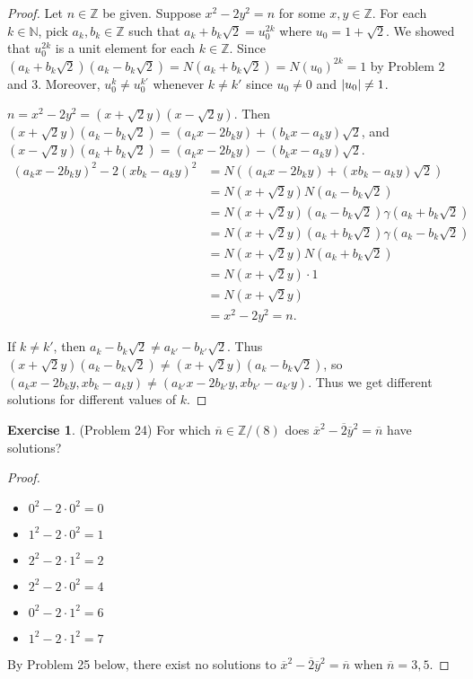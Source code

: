 \documentclass[12pt, psamsfonts]{amsart}
\theoremstyle{definition}
\newtheorem*{exer}{Exercise}
\theoremstyle{remark}
\numberwithin{equation}{section}
\begin{document}
\begin{proof}
  Let $n \in \mathbb{Z}$ be given.
  Suppose $x^2 - 2y^2 = n$ for some $x, y \in \mathbb{Z}$.
  For each $k \in \mathbb{N}$, pick $a_k, b_k \in \mathbb{Z}$ such that $a_k + b_k\sqrt{2} = u_0^{2k}$ where $u_0 = 1 + \sqrt{2}$.
  We showed that $u_0^{2k}$ is a unit element for each $k \in \mathbb{Z}$.
  Since $(a_k + b_k\sqrt{2})(a_k - b_k\sqrt{2}) = N(a_k + b_k\sqrt{2}) = N(u_0)^{2k} = 1$ by Problem 2 and 3.
  Moreover, $u_0^k \ne u_0^{k'}$ whenever $k \ne k'$ since $u_0 \ne 0$ and $\abs{u_0} \ne 1$.

  $n = x^2 - 2y^2 = (x + \sqrt{2}y)(x - \sqrt{2}y)$.
  Then $(x + \sqrt{2}y)(a_k - b_k\sqrt{2}) = (a_kx - 2b_ky) + (b_kx - a_ky)\sqrt{2}$, and $(x - \sqrt{2}y)(a_k + b_k\sqrt{2}) = (a_kx - 2b_ky) - (b_kx - a_ky)\sqrt{2}$.
  \begin{align*}
    (a_kx - 2b_ky)^2 - 2(xb_k - a_ky)^2
      &= N((a_kx - 2b_ky) + (xb_k - a_ky)\sqrt{2}) \\
      &= N(x + \sqrt{2}y)N(a_k - b_k\sqrt{2}) \\
      &= N(x + \sqrt{2}y)(a_k - b_k\sqrt{2})\gamma(a_k + b_k\sqrt{2}) \\
      &= N(x + \sqrt{2}y)(a_k + b_k\sqrt{2})\gamma(a_k - b_k\sqrt{2}) \\
      &= N(x + \sqrt{2}y)N(a_k + b_k\sqrt{2}) \\
      &= N(x + \sqrt{2}y) \cdot 1 \\
      &= N(x + \sqrt{2}y) \\
      &= x^2 - 2y^2 = n.
  \end{align*}

  If $k \ne k'$, then $a_k - b_k\sqrt{2} \ne a_{k'} - b_{k'}\sqrt{2}$.
  Thus $(x + \sqrt{2}y)(a_k - b_k\sqrt{2}) \ne (x + \sqrt{2}y)(a_k - b_k\sqrt{2})$, so $(a_kx - 2b_ky, xb_k - a_ky) \ne (a_{k'}x - 2b_{k'}y, xb_{k'} - a_{k'}y)$.
  Thus we get different solutions for different values of $k$.

\end{proof}

\begin{exer}{(Problem 24)}
  For which $\overline{n} \in \mathbb{Z}/(8)$ does $\overline{x}^2 - \overline{2}\overline{y}^2 = \overline{n}$ have solutions?
\end{exer}

\begin{proof}
  $ $
  \begin{itemize}
    \item $0^2 - 2 \cdot 0^2 = 0$
    \item $1^2 - 2 \cdot 0^2 = 1$
    \item $2^2 - 2 \cdot 1^2 = 2$
    \item $2^2 - 2 \cdot 0^2 = 4$
    \item $0^2 - 2 \cdot 1^2 = 6$
    \item $1^2 - 2 \cdot 1^2 = 7$
  \end{itemize}
  By Problem 25 below, there exist no solutions to $\overline{x}^2 - \overline{2}\overline{y}^2 = \overline{n}$ when $\overline{n} = 3, 5$.

\end{proof}
\end{document}
